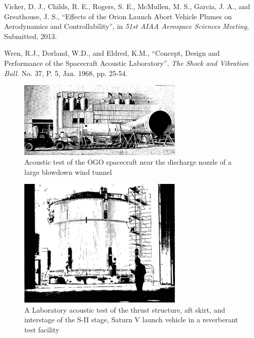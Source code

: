 \documentclass[]{aiaa-tc}%
\begin{document}
\begin{thebibliography}{9}
Vicker, D. J., Childs, R. E., Rogers, S. E., McMullen, M. S., Garcia, J. A., and Greathouse, J. S.,  ``Effects of the Orion Launch Abort Vehicle Plumes on Aerodynamics and Controllability'', in {\it 51st AIAA Aerospace Sciences Meeting}, Submitted, 2013.

Wren, R.J., Dorland, W.D., and Eldred, K.M., ``Concept, Design and Performance of the Spacecraft Acoustic Laboratory'', {\it The Shock and Vibration Bull.} No. 37, P. 5, Jan. 1968, pp. 25-54.




\end{thebibliography}




\begin{figure}[htb]
\begin{center}
\includegraphics[width=0.7\textwidth]{Images/Himelblau_Fig36.png}
\caption{Acoustic test of the OGO spacecraft near the discharge nozzle of a large blowdown wind tunnel\cite{SpaceVehicleAeroacousticVibrationPrediction}}
\label{FreeFieldTest}
\end{center}
\end{figure}


\begin{figure}[htb]
\begin{center}
\includegraphics[width=0.7\textwidth]{Images/Himelblau_Fig37.png}
\caption{A Laboratory acoustic test of the thrust structure, aft skirt, and interstage of the S-II stage, Saturn V launch vehicle in a reverberant test facility \cite{SpaceVehicleAeroacousticVibrationPrediction}}
\label{ReverberantTest}
\end{center}
\end{figure}
\end{document}
